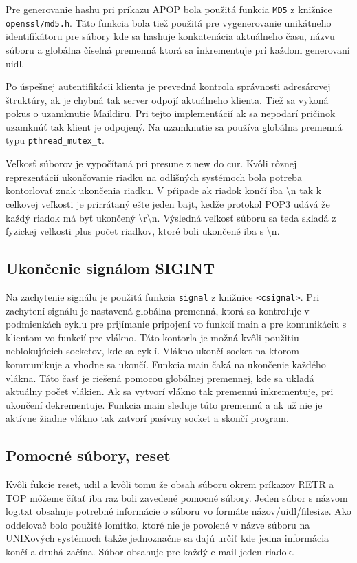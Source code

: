 \documentclass[11pt,a4paper]{article}
\begin{document}
Pre generovanie hashu pri príkazu APOP bola použitá funkcia \texttt{MD5} z knižnice \texttt{openssl/md5.h}. Táto funkcia bola tiež použitá pre vygenerovanie unikátneho identifikátoru pre súbory kde sa hashuje konkatenácia aktuálneho času, názvu súboru a globálna číselná premenná ktorá sa inkrementuje pri každom generovaní uidl.

Po úspešnej autentifikácii klienta je prevedná kontrola správnosti adresárovej štruktúry, ak je chybná tak server odpojí aktuálneho klienta. Tiež sa vykoná pokus o uzamknutie Maildiru. Pri tejto implementácií ak sa nepodarí pričinok uzamknúť tak klient je odpojený. Na uzamknutie sa používa globálna premenná typu \texttt{pthread\_mutex\_t}.    

Veľkosť súborov je vypočítaná pri presune z new do cur. Kvôli rôznej reprezentácií ukončovanie riadku na odlišných systémoch bola potreba kontorlovať znak ukončenia riadku. V pŕipade ak riadok končí iba \textbackslash n tak k celkovej veľkosti je prirrátaný ešte jeden bajt, kedže protokol POP3 udává že každý riadok má byť ukončený \textbackslash r\textbackslash n. Výsledná veľkosť súboru sa teda skladá z fyzickej velkosti plus počet riadkov, ktoré boli ukončené iba s \textbackslash n.




\subsection{Ukončenie signálom SIGINT}
Na zachytenie signálu je použitá funkcia \texttt{signal} z knižnice \texttt{<csignal>}. Pri zachytení signálu je nastavená globálna premenná, ktorá sa kontroluje v podmienkách 
cyklu pre prijímanie pripojení vo funkcií main a pre komunikáciu s klientom vo funkcií pre vlákno. Táto kontorla je možná kvôli použitiu neblokujúcich socketov, kde sa cyklí. Vlákno ukončí socket na ktorom kommunikuje a vhodne sa ukončí. Funkcia main čaká na ukončenie každého vlákna. Táto časť je riešená pomocou globálnej premennej, kde sa ukladá aktuálny počet vlákien. Ak sa vytvorí vlákno tak premennú inkrementuje, pri ukončení dekrementuje. Funkcia main sleduje túto premennú a ak už nie je aktívne žiadne vlákno tak zatvorí pasívny socket a skončí program.

\subsection{Pomocné súbory, reset}
Kvôli fukcie reset, udil a kvôli tomu že obsah súboru okrem príkazov RETR a TOP môžeme čítať iba raz boli zavedené pomocné súbory. Jeden súbor s názvom log.txt obsahuje potrebné informácie o súboru vo formáte názov/uidl/filesize. Ako oddelovač bolo použité lomítko, ktoré nie je povolené v názve súboru na UNIXových systémoch takže jednoznačne sa dajú určiť kde jedna informácia končí a druhá začína. Súbor obsahuje pre každý e-mail jeden riadok. 
\end{document}
